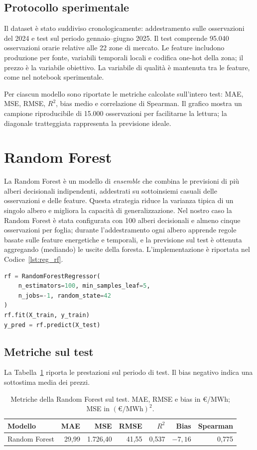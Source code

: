 \subsection{Protocollo sperimentale}
Il dataset è stato suddiviso cronologicamente: addestramento sulle osservazioni del 2024 e test sul periodo gennaio--giugno 2025. Il test comprende 95.040 osservazioni orarie relative alle 22 zone di mercato. Le feature includono produzione per fonte, variabili temporali locali e codifica one-hot della zona; il prezzo è la variabile obiettivo. La variabile di qualità è mantenuta tra le feature, come nel notebook sperimentale.

Per ciascun modello sono riportate le metriche calcolate sull'intero test: MAE, MSE, RMSE, $R^2$, bias medio e correlazione di Spearman. Il grafico mostra un campione riproducibile di 15.000 osservazioni per facilitarne la lettura; la diagonale tratteggiata rappresenta la previsione ideale.

\newpage

\section{Random Forest}
La Random Forest è un modello di \textit{ensemble} che combina le previsioni di più alberi decisionali indipendenti, addestrati su sottoinsiemi casuali delle osservazioni e delle feature. Questa strategia riduce la varianza tipica di un singolo albero e migliora la capacità di generalizzazione. Nel nostro caso la Random Forest è stata configurata con 100 alberi decisionali e almeno cinque osservazioni per foglia; durante l'addestramento ogni albero apprende regole basate sulle feature energetiche e temporali, e la previsione sul test è ottenuta aggregando (mediando) le uscite della foresta. L'implementazione è riportata nel Codice~\ref{lst:reg_rf}.

\begin{lstlisting}[language=Python, caption={Addestramento e previsione con Random Forest.}, label={lst:reg_rf}]
rf = RandomForestRegressor(
    n_estimators=100, min_samples_leaf=5,
    n_jobs=-1, random_state=42
)
rf.fit(X_train, y_train)
y_pred = rf.predict(X_test)
\end{lstlisting}

\subsection{Metriche sul test}
La Tabella~\ref{tab:reg_metriche_rf} riporta le prestazioni sul periodo di test. Il bias negativo indica una sottostima media dei prezzi.
\begin{table}[htbp]
    \centering\small
    \begin{tabular}{|l|r|r|r|r|r|r|}\hline
    \rowcolor[gray]{0.9} Modello & MAE & MSE & RMSE & $R^2$ & Bias & Spearman \\
    \hline
    Random Forest & 29,99 & 1.726,40 & 41,55 & 0,537 & $-7,16$ & 0,775 \\
    \hline\end{tabular}
    \caption{Metriche della Random Forest sul test. MAE, RMSE e bias in \euro/MWh; MSE in $(\euro/\mathrm{MWh})^2$.}
    \label{tab:reg_metriche_rf}
\end{table}

